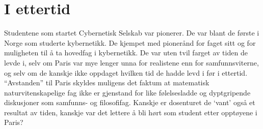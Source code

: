 \section{I ettertid}

Studentene som startet Cybernetisk Selskab var pionerer. De var blant de første i Norge som studerte kybernetikk. De kjempet med pionerånd for faget sitt og for muligheten til å ta hovedfag i kybernetikk. De var uten tvil farget av tiden de levde i, selv om Paris var mye lenger unna for realistene enn for samfunnsviterne, og selv om de kanskje ikke oppdaget hvilken tid de hadde levd i før i ettertid. ``Avstanden'' til Paris skyldes muligens det faktum at matematisk naturvitenskapelige fag ikke er gjenstand for like følelsesladde og dyptgripende diskusjoner som samfunns- og filosofifag. Kanskje er dosenturet de `vant' også et resultat av tiden, kanskje var det lettere å bli hørt som student etter opptøyene i Paris?
